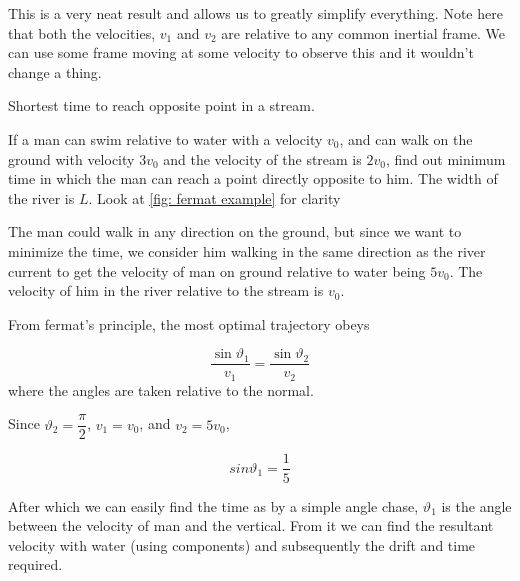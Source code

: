This is a very neat result and allows us to greatly simplify everything. Note 
here that both the velocities, \(v_1\) and \(v_2\) are relative to any common inertial
frame. We can use some frame moving at some velocity to observe this and it wouldn't change 
a thing. 

\begin{marginfigure}
    \centering
    \caption{Shortest time to reach opposite point in a stream.}
    \label{fig: fermat example}
\end{marginfigure}

\begin{example}
    If a man can swim relative to water with a velocity \(v_0\), and can walk on the ground 
    with velocity \(3v_0\) and the velocity of the stream is \(2v_0\), find out minimum time 
    in which the man can reach a point directly opposite to him. The width of the river is \(L\).
    Look at \cref{fig: fermat example} for clarity

    \begin{soln}
        The man could walk in any direction on the ground, but since we want to minimize 
        the time, we consider him walking in the same direction as the river current to get 
        the velocity of man on ground relative to water being \(5v_0\). The velocity 
        of him in the river relative to the stream is \(v_0\). 

        From fermat's principle, the most optimal trajectory obeys 
        
        \begin{equation*}
            \frac{\sin\vartheta_1}{v_1} = \frac{\sin\vartheta_2}{v_2}
        \end{equation*}
        where the angles are taken relative to the normal. 
        
        Since \(\vartheta_2 = \dfrac{\pi}{2}\), \(v_1 = v_0\), and \(v_2 = 5v_0\),

        \begin{equation*}
            sin\vartheta_1 = \frac{1}{5}
        \end{equation*}

        After which we can easily find the time as by a simple angle chase, \(\vartheta_1\) is 
        the angle between the velocity of man and the vertical. From it we 
        can find the resultant velocity with water (using components) 
        and subsequently the drift and time required.
    \end{soln}
\end{example}